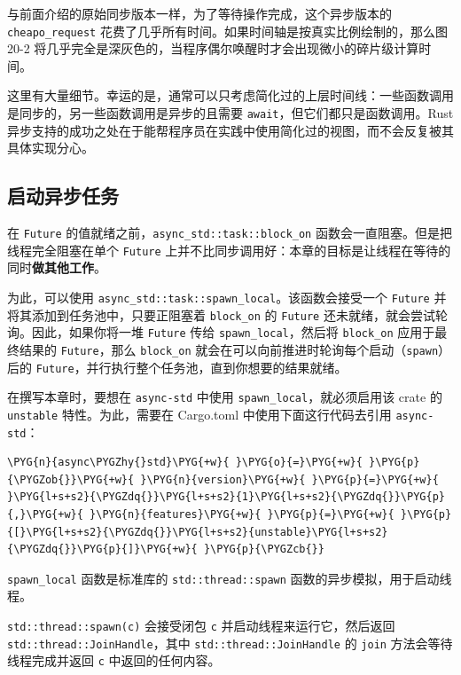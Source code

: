 与前面介绍的原始同步版本一样，为了等待操作完成，这个异步版本的 \texttt{cheapo\_request} 花费了几乎所有时间。如果时间轴是按真实比例绘制的，那么图 20-2 将几乎完全是深灰色的，当程序偶尔唤醒时才会出现微小的碎片级计算时间。

这里有大量细节。幸运的是，通常可以只考虑简化过的上层时间线：一些函数调用是同步的，另一些函数调用是异步的且需要 \texttt{await}，但它们都只是函数调用。Rust 异步支持的成功之处在于能帮程序员在实践中使用简化过的视图，而不会反复被其具体实现分心。

\subsection{启动异步任务}

在 \texttt{Future} 的值就绪之前，\texttt{async\_std::task::block\_on} 函数会一直阻塞。但是把线程完全阻塞在单个 \texttt{Future} 上并不比同步调用好：本章的目标是让线程在等待的同时\textbf{做其他工作}。

为此，可以使用 \texttt{async\_std::task::spawn\_local}。该函数会接受一个 \texttt{Future} 并将其添加到任务池中，只要正阻塞着 \texttt{block\_on} 的 \texttt{Future} 还未就绪，就会尝试轮询。因此，如果你将一堆 \texttt{Future} 传给 \texttt{spawn\_local}，然后将 \texttt{block\_on} 应用于最终结果的 \texttt{Future}，那么 \texttt{block\_on} 就会在可以向前推进时轮询每个启动（\texttt{spawn}）后的 \texttt{Future}，并行执行整个任务池，直到你想要的结果就绪。

在撰写本章时，要想在 \texttt{async-std} 中使用 \texttt{spawn\_local}，就必须启用该 crate 的 \texttt{unstable} 特性。为此，需要在 Cargo.toml 中使用下面这行代码去引用 \texttt{async-std}：

\begin{Verbatim}[commandchars=\\\{\},breaklines=true,breakanywhere=true,fontsize=\codefont,xleftmargin=17bp]
\PYG{n}{async\PYGZhy{}std}\PYG{+w}{ }\PYG{o}{=}\PYG{+w}{ }\PYG{p}{\PYGZob{}}\PYG{+w}{ }\PYG{n}{version}\PYG{+w}{ }\PYG{p}{=}\PYG{+w}{ }\PYG{l+s+s2}{\PYGZdq{}}\PYG{l+s+s2}{1}\PYG{l+s+s2}{\PYGZdq{}}\PYG{p}{,}\PYG{+w}{ }\PYG{n}{features}\PYG{+w}{ }\PYG{p}{=}\PYG{+w}{ }\PYG{p}{[}\PYG{l+s+s2}{\PYGZdq{}}\PYG{l+s+s2}{unstable}\PYG{l+s+s2}{\PYGZdq{}}\PYG{p}{]}\PYG{+w}{ }\PYG{p}{\PYGZcb{}}
\end{Verbatim}

\texttt{spawn\_local} 函数是标准库的 \texttt{std::thread::spawn} 函数的异步模拟，用于启动线程。

\texttt{std::thread::spawn(c)} 会接受闭包 \texttt{c} 并启动线程来运行它，然后返回 \texttt{std::thread::JoinHandle}，其中 \texttt{std::thread::JoinHandle} 的 \texttt{join} 方法会等待线程完成并返回 \texttt{c} 中返回的任何内容。

